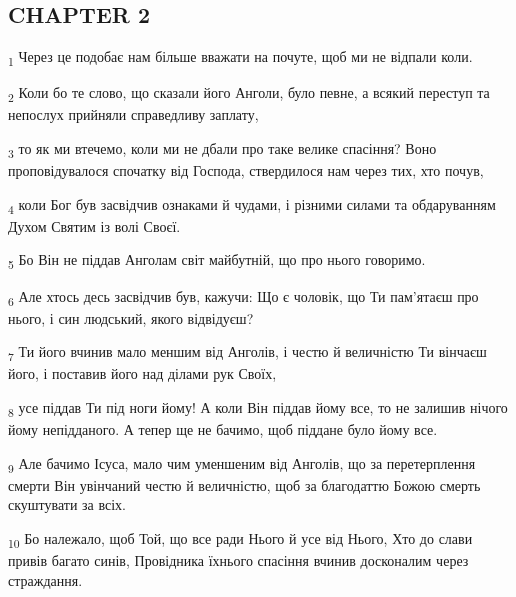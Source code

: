 \subsection{CHAPTER 2}
\begin{tcolorbox}
\textsubscript{1} Через це подобає нам більше вважати на почуте, щоб ми не відпали коли.
\end{tcolorbox}
\begin{tcolorbox}
\textsubscript{2} Коли бо те слово, що сказали його Анголи, було певне, а всякий переступ та непослух прийняли справедливу заплату,
\end{tcolorbox}
\begin{tcolorbox}
\textsubscript{3} то як ми втечемо, коли ми не дбали про таке велике спасіння? Воно проповідувалося спочатку від Господа, ствердилося нам через тих, хто почув,
\end{tcolorbox}
\begin{tcolorbox}
\textsubscript{4} коли Бог був засвідчив ознаками й чудами, і різними силами та обдаруванням Духом Святим із волі Своєї.
\end{tcolorbox}
\begin{tcolorbox}
\textsubscript{5} Бо Він не піддав Анголам світ майбутній, що про нього говоримо.
\end{tcolorbox}
\begin{tcolorbox}
\textsubscript{6} Але хтось десь засвідчив був, кажучи: Що є чоловік, що Ти пам'ятаєш про нього, і син людський, якого відвідуєш?
\end{tcolorbox}
\begin{tcolorbox}
\textsubscript{7} Ти його вчинив мало меншим від Анголів, і честю й величністю Ти вінчаєш його, і поставив його над ділами рук Своїх,
\end{tcolorbox}
\begin{tcolorbox}
\textsubscript{8} усе піддав Ти під ноги йому! А коли Він піддав йому все, то не залишив нічого йому непідданого. А тепер ще не бачимо, щоб піддане було йому все.
\end{tcolorbox}
\begin{tcolorbox}
\textsubscript{9} Але бачимо Ісуса, мало чим уменшеним від Анголів, що за перетерплення смерти Він увінчаний честю й величністю, щоб за благодаттю Божою смерть скуштувати за всіх.
\end{tcolorbox}
\begin{tcolorbox}
\textsubscript{10} Бо належало, щоб Той, що все ради Нього й усе від Нього, Хто до слави привів багато синів, Провідника їхнього спасіння вчинив досконалим через страждання.
\end{tcolorbox}
